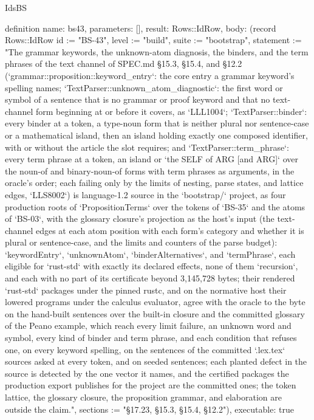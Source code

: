 \begin{lexlean}{IdsBS}
\begin{semanticmodule}
definition{
  name: bs43,
  parameters: [],
  result: Rows::IdRow,
  body: (record Rows::IdRow {id := "BS-43", level := "build", suite := "bootstrap", statement := "The grammar keywords, the unknown-atom diagnosis, the binders, and the term phrases of the text channel of SPEC.md §15.3, §15.4, and §12.2 (`grammar::proposition::keyword_entry`: the core entry a grammar keyword's spelling names; `TextParser::unknown_atom_diagnostic`: the first word or symbol of a sentence that is no grammar or proof keyword and that no text-channel form beginning at or before it covers, as `LLL1004`; `TextParser::binder`: every binder at a token, a type-noun form that is neither plural nor sentence-case or a mathematical island, then an island holding exactly one composed identifier, with or without the article the slot requires; and `TextParser::term_phrase`: every term phrase at a token, an island or `the SELF of ARG [and ARG]` over the noun-of and binary-noun-of forms with term phrases as arguments, in the oracle's order; each failing only by the limits of nesting, parse states, and lattice edges, `LLS8002`) is language-1.2 source in the `bootstrap/` project, as four production roots of `PropositionTerms` over the tokens of `BS-35` and the atoms of `BS-03`, with the glossary closure's projection as the host's input (the text-channel edges at each atom position with each form's category and whether it is plural or sentence-case, and the limits and counters of the parse budget): `keywordEntry`, `unknownAtom`, `binderAlternatives`, and `termPhrase`, each eligible for `rust-std` with exactly its declared effects, none of them `recursion`, and each with no part of its certificate beyond 3,145,728 bytes; their rendered `rust-std` packages under the pinned rustc, and on the normative host their lowered programs under the calculus evaluator, agree with the oracle to the byte on the hand-built sentences over the built-in closure and the committed glossary of the Peano example, which reach every limit failure, an unknown word and symbol, every kind of binder and term phrase, and each condition that refuses one, on every keyword spelling, on the sentences of the committed `.lex.tex` sources asked at every token, and on seeded sentences; each planted defect in the source is detected by the one vector it names, and the certified packages the production export publishes for the project are the committed ones; the token lattice, the glossary closure, the proposition grammar, and elaboration are outside the claim.", sections := "§17.23, §15.3, §15.4, §12.2"}),
  executable: true
}


\end{semanticmodule}
\end{lexlean}
